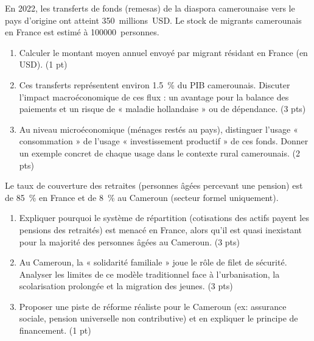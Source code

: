 \documentclass[11pt]{article}
\begin{document}
\begin{exercice}
En 2022, les transferts de fonds (remesas) de la diaspora camerounaise vers le pays d'origine ont atteint \SI{350}{millions USD}. Le stock de migrants camerounais en France est estimé à \SI{100 000}{personnes}.

\begin{enumerate}
    \item Calculer le montant moyen annuel envoyé par migrant résidant en France (en USD). (1 pt)
    \item Ces transferts représentent environ \SI{1,5}{\percent} du PIB camerounais. Discuter l'impact macroéconomique de ces flux : un avantage pour la balance des paiements et un risque de « maladie hollandaise » ou de dépendance. (3 pts)
    \item Au niveau microéconomique (ménages restés au pays), distinguer l'usage « consommation » de l'usage « investissement productif » de ces fonds. Donner un exemple concret de chaque usage dans le contexte rural camerounais. (2 pts)
\end{enumerate}
\end{exercice}

\begin{exercice}
Le taux de couverture des retraites (personnes âgées percevant une pension) est de \SI{85}{\percent} en France et de \SI{8}{\percent} au Cameroun (secteur formel uniquement).

\begin{enumerate}
    \item Expliquer pourquoi le système de répartition (cotisations des actifs payent les pensions des retraités) est menacé en France, alors qu'il est quasi inexistant pour la majorité des personnes âgées au Cameroun. (3 pts)
    \item Au Cameroun, la « solidarité familiale » joue le rôle de filet de sécurité. Analyser les limites de ce modèle traditionnel face à l'urbanisation, la scolarisation prolongée et la migration des jeunes. (3 pts)
    \item Proposer une piste de réforme réaliste pour le Cameroun (ex: assurance sociale, pension universelle non contributive) et en expliquer le principe de financement. (1 pt)
\end{enumerate}
\end{exercice}
\end{document}
